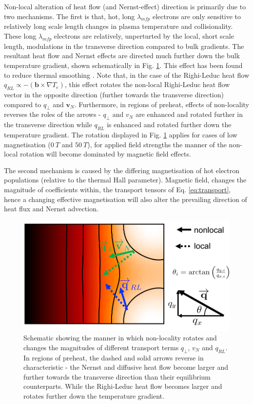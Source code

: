 \documentclass[aip,reprint]{revtex4-1}
\begin{document}
Non-local alteration of heat flow (and Nernst-effect)  direction is primarily due to two mechanisms. The first is that, hot, long $\lambda_{mfp}$ electrons are only sensitive to relatively long scale length changes in plasma temperature and collisionality. These long $\lambda_{mfp}$ electrons are relatively, unperturted by the local, short scale length, modulations in the transverse direction compared to bulk gradients. The resultant heat flow and Nernst effects are directed much further down the bulk temperature gradient,  shown schematically in Fig. \ref{fig:heat_flow_rotation}. This effect has been found to reduce thermal smoothing \cite{Epperlein1988}. Note that, in the case of the Righi-Leduc heat flow $q_{RL} \propto -(\mathbf{b} \times \nabla T_e)$, this effect rotates the non-local Righi-Leduc heat flow vector in the opposite direction (further towards the transverse direction) compared to $q_{\perp}$ and $\mathbf{v}_N$. Furthermore, in regions of preheat, effects of non-locality reverses the roles of the arrows - $q_{\perp}$ and $v_N$ are enhanced and rotated further in the transverse direction while $q_{RL}$ is enhanced and rotated further down the temperature gradient. The rotation displayed in Fig. \ref{fig:heat_flow_rotation} applies for cases of low magnetisation ($\SI{0}{T}$ and $\SI{50}{T}$), for applied field strengths the manner of the non-local rotation will become dominated by magnetic field effects.

The second mechanism is caused by the differing magnetisation of hot electron populations (relative to the thermal Hall parameter). Magnetic field, changes the magnitude of coefficients within, the transport tensors of Eq. \ref{eq:transport}, hence a changing effective magnetisation will also alter the prevailing direction of heat flux and Nernst advection.

\begin{figure}
	\includegraphics[width=1.0\columnwidth]{pics/heatflow_angle_schematic.pdf}
	\caption{\label{fig:heat_flow_rotation} Schematic showing the manner in which non-locality rotates and changes the magnitudes of different transport terms $q_{\perp}$, $v_N$ and $q_{RL}$. In regions of preheat, the dashed and solid arrows reverse in characteristic - the Nernst and diffusive heat flow become larger and further towards the transverse direction than their equilibrium counterparts. While the Righi-Leduc heat flow becomes larger and rotates further down the temperature gradient. }
\end{figure}
\end{document}
